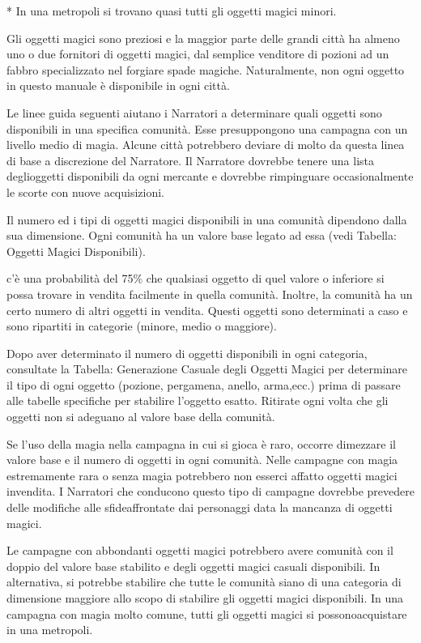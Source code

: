 \documentclass[a4paper,11pt,twoside,openany]{book}
\begin{document}
{*} In una metropoli si trovano quasi tutti gli oggetti magici minori.

\bigskip

Gli oggetti magici sono preziosi e la maggior parte delle grandi città ha almeno uno o due fornitori di oggetti magici, dal semplice venditore di pozioni ad un fabbro specializzato nel forgiare spade magiche. Naturalmente, non ogni oggetto in questo manuale è disponibile in ogni città.

Le linee guida seguenti aiutano i Narratori a determinare quali oggetti sono disponibili in una specifica comunità. Esse presuppongono una campagna con un livello medio di magia. Alcune città potrebbero deviare di molto da questa linea di base a discrezione del Narratore. Il Narratore dovrebbe tenere una lista deglioggetti disponibili da ogni mercante e dovrebbe rimpinguare occasionalmente le scorte con nuove acquisizioni.

Il numero ed i tipi di oggetti magici disponibili in una comunità dipendono dalla sua dimensione. Ogni comunità ha un valore base legato ad essa (vedi Tabella: Oggetti Magici Disponibili).

c'è una probabilità del 75\% che qualsiasi oggetto di quel valore o inferiore si possa trovare in vendita facilmente in quella comunità. Inoltre, la comunità ha un certo numero di altri oggetti in vendita. Questi oggetti sono determinati a caso e sono ripartiti in categorie (minore, medio o maggiore).

Dopo aver determinato il numero di oggetti disponibili in ogni categoria, consultate la Tabella: Generazione Casuale degli Oggetti Magici per determinare il tipo di ogni oggetto (pozione, pergamena, anello, arma,ecc.) prima di passare alle tabelle specifiche per stabilire l'oggetto esatto. Ritirate ogni volta che gli oggetti non si adeguano al valore base della comunità.

Se l'uso della magia nella campagna in cui si gioca è raro, occorre dimezzare il valore base e il numero di oggetti in ogni comunità. Nelle campagne con magia estremamente rara o senza magia potrebbero non esserci affatto oggetti magici invendita. I Narratori che conducono questo tipo di campagne dovrebbe prevedere delle modifiche alle sfideaffrontate dai personaggi data la mancanza di oggetti magici.

Le campagne con abbondanti oggetti magici potrebbero avere comunità con il doppio del valore base stabilito e degli oggetti magici casuali disponibili. In alternativa, si potrebbe stabilire che tutte le comunità siano di una categoria di dimensione maggiore allo scopo di stabilire gli oggetti magici disponibili. In una campagna con magia molto comune, tutti gli oggetti magici si possonoacquistare in una metropoli.
\end{document}
